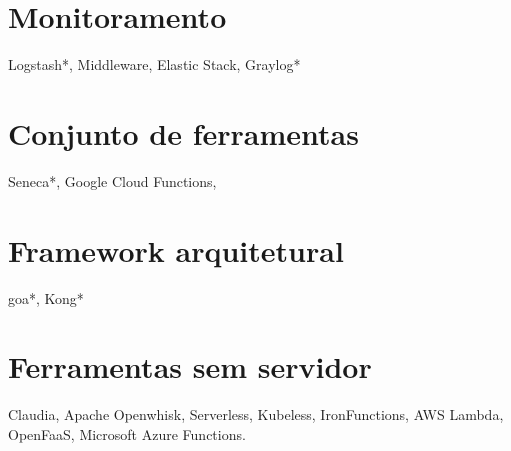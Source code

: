 





\section{Monitoramento}
Logstash*, Middleware, Elastic Stack, Graylog*

\section{Conjunto de ferramentas}
Seneca*, Google Cloud Functions,

\section{Framework arquitetural}
goa*, Kong*

\section{Ferramentas sem servidor}
Claudia, Apache Openwhisk, Serverless, Kubeless, IronFunctions, AWS Lambda, OpenFaaS, Microsoft Azure Functions.


